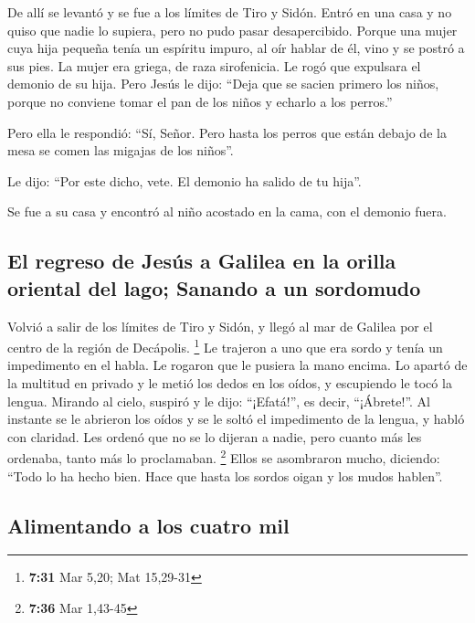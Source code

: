  De allí se levantó y se fue a los límites de Tiro y
Sidón. Entró en una casa y no quiso que nadie lo supiera, pero no pudo
pasar desapercibido.  Porque una mujer cuya hija pequeña
tenía un espíritu impuro, al oír hablar de él, vino y se postró a sus
pies.  La mujer era griega, de raza sirofenicia. Le rogó
que expulsara el demonio de su hija.  Pero Jesús le dijo:
``Deja que se sacien primero los niños, porque no conviene tomar el pan
de los niños y echarlo a los perros.''

 Pero ella le respondió: ``Sí, Señor. Pero hasta los
perros que están debajo de la mesa se comen las migajas de los niños''.

 Le dijo: ``Por este dicho, vete. El demonio ha salido de
tu hija''.

 Se fue a su casa y encontró al niño acostado en la cama,
con el demonio fuera.

\hypertarget{el-regreso-de-jesuxfas-a-galilea-en-la-orilla-oriental-del-lago-sanando-a-un-sordomudo}{%
\subsection{El regreso de Jesús a Galilea en la orilla oriental del
lago; Sanando a un
sordomudo}\label{el-regreso-de-jesuxfas-a-galilea-en-la-orilla-oriental-del-lago-sanando-a-un-sordomudo}}

 Volvió a salir de los límites de Tiro y Sidón, y llegó
al mar de Galilea por el centro de la región de Decápolis. \footnote{\textbf{7:31}
  Mar 5,20; Mat 15,29-31}  Le trajeron a uno que era
sordo y tenía un impedimento en el habla. Le rogaron que le pusiera la
mano encima.  Lo apartó de la multitud en privado y le
metió los dedos en los oídos, y escupiendo le tocó la lengua.
 Mirando al cielo, suspiró y le dijo: ``¡Efatá!'', es
decir, ``¡Ábrete!''.  Al instante se le abrieron los
oídos y se le soltó el impedimento de la lengua, y habló con claridad.
 Les ordenó que no se lo dijeran a nadie, pero cuanto más
les ordenaba, tanto más lo proclamaban. \footnote{\textbf{7:36} Mar
  1,43-45}  Ellos se asombraron mucho, diciendo: ``Todo
lo ha hecho bien. Hace que hasta los sordos oigan y los mudos hablen''.

\hypertarget{alimentando-a-los-cuatro-mil}{%
\subsection{Alimentando a los cuatro
mil}\label{alimentando-a-los-cuatro-mil}}

